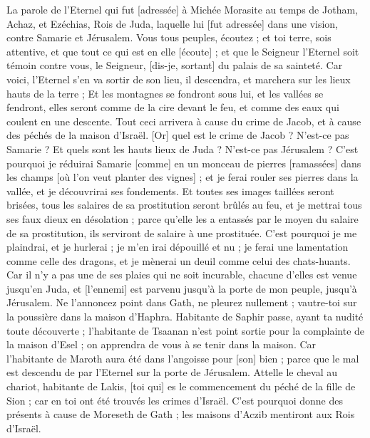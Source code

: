 \BFont
\begin{multicols}{2}
\VerseOne{}La parole de l'Eternel qui fut [adressée] à Michée Morasite au temps de Jotham, Achaz, et Ezéchias, Rois de Juda, laquelle lui [fut adressée] dans une vision, contre Samarie et Jérusalem.
Vous tous peuples, écoutez ; et toi terre, sois attentive, et que tout ce qui est en elle [écoute] ; et que le Seigneur l'Eternel soit témoin contre vous, le Seigneur, [dis-je, sortant] du palais de sa sainteté.
Car voici, l'Eternel s'en va sortir de son lieu, il descendra, et marchera sur les lieux hauts de la terre ;
Et les montagnes se fondront sous lui, et les vallées se fendront, elles seront comme de la cire devant le feu, et comme des eaux qui coulent en une descente.
Tout ceci arrivera à cause du crime de Jacob, et à cause des péchés de la maison d'Israël. [Or] quel est le crime de Jacob ? N'est-ce pas Samarie ? Et quels sont les hauts lieux de Juda ? N'est-ce pas Jérusalem ?
C'est pourquoi je réduirai Samarie [comme] en un monceau de pierres [ramassées] dans les champs [où l'on veut planter des vignes] ; et je ferai rouler ses pierres dans la vallée, et je découvrirai ses fondements.
Et toutes ses images taillées seront brisées, tous les salaires de sa prostitution seront brûlés au feu, et je mettrai tous ses faux dieux en désolation ; parce qu'elle les a entassés par le moyen du salaire de sa prostitution, ils serviront de salaire à une prostituée.
C'est pourquoi je me plaindrai, et je hurlerai ; je m'en irai dépouillé et nu ; je ferai une lamentation comme celle des dragons, et je mènerai un deuil comme celui des chats-huants.
Car il n'y a pas une de ses plaies qui ne soit incurable, chacune d'elles est venue jusqu'en Juda, et [l'ennemi] est parvenu jusqu'à la porte de mon peuple, jusqu'à Jérusalem.
Ne l'annoncez point dans Gath, ne pleurez nullement ; vautre-toi sur la poussière dans la maison d'Haphra.
Habitante de Saphir passe, ayant ta nudité toute découverte ; l'habitante de Tsaanan n'est point sortie pour la complainte de la maison d'Esel ; on apprendra de vous à se tenir dans la maison.
Car l'habitante de Maroth aura été dans l'angoisse pour [son] bien ; parce que le mal est descendu de par l'Eternel sur la porte de Jérusalem.
Attelle le cheval au chariot, habitante de Lakis, [toi qui] es le commencement du péché de la fille de Sion ; car en toi ont été trouvés les crimes d'Israël.
C'est pourquoi donne des présents à cause de Moreseth de Gath ; les maisons d'Aczib mentiront aux Rois d'Israël.

\end{multicols}

